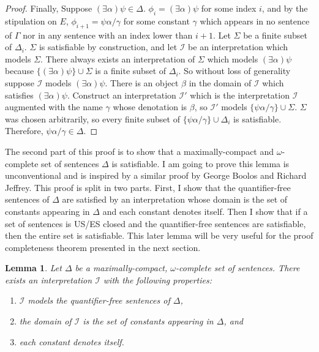 \documentclass[12pt]{article}
\newtheorem{lemma}[theorem]{Lemma}
\theoremstyle{definition}
\theoremstyle{remark}
\begin{document}
\begin{proof}
	Finally, Suppose $(\exists \alpha)\psi \in \Delta$. $\phi_i =(\exists \alpha)\psi$ for some index $i$, and by the stipulation on $E$, $\phi_{i+1}=\psi\alpha/\gamma$ for some constant $\gamma$ which appears in no sentence of $\Gamma$ nor in any sentence with an index lower than $i+1$. Let $\Sigma$ be a finite subset of $\Delta_i$. $\Sigma$ is satisfiable by construction, and let $\mathscr{I}$ be an interpretation which models $\Sigma$. There always exists an interpretation of $\Sigma$ which models $(\exists \alpha)\psi$ because $\{ (\exists \alpha)\psi \} \cup \Sigma$ is a finite subset of $\Delta_i$. So without loss of generality suppose $\mathscr{I}$ models $(\exists \alpha)\psi$. There is an object $\beta$ in the domain of $\mathscr{I}$ which satisfies $(\exists \alpha)\psi$. Construct an interpretation $\mathscr{I}'$ which is the interpretation $\mathscr{I}$ augmented with the name $\gamma$ whose denotation is $\beta$, so $\mathscr{I}'$ models $\{ \psi\alpha/\gamma \} \cup \Sigma$. $\Sigma$ was chosen arbitrarily, so every finite subset of $\{ \psi\alpha/\gamma \} \cup \Delta_i$ is satisfiable. Therefore, $\psi\alpha/\gamma \in \Delta$.
\end{proof}

The second part of this proof is to show that a maximally-compact and $\omega$-complete set of sentences $\Delta$ is satisfiable. I am going to prove this lemma is unconventional and is inspired by a similar proof by George Boolos and Richard Jeffrey\cite{boolosjeffrey}. This proof is split in two parts. First, I show that the quantifier-free sentences of $\Delta$ are satisfied by an interpretation whose domain is the set of constants appearing in $\Delta$ and each constant denotes itself. Then I show that if a set of sentences is US/ES closed and the quantifier-free sentences are satisfiable, then the entire set is satisfiable. This later lemma will be very useful for the proof completeness theorem presented in the next section. 

\begin{lemma}
	\label{lem:q-free-sat}
	Let $\Delta$ be a maximally-compact, $\omega$-complete set of sentences. There exists an interpretation $\mathscr{I}$ with the following properties:
	
	\begin{enumerate}
		\item $\mathscr{I}$ models the quantifier-free sentences of $\Delta$,
		\item the domain of $\mathscr{I}$ is the set of constants appearing in $\Delta$, and
		\item each constant denotes itself.
	\end{enumerate}
\end{lemma}
\end{document}
